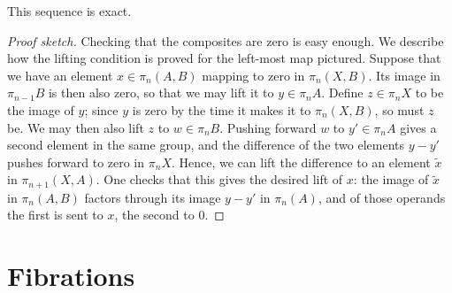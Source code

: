 \begin{lemma}
This sequence is exact.
\end{lemma}
\begin{proof}[Proof sketch]
Checking that the composites are zero is easy enough.
We describe how the lifting condition is proved for the left-most map pictured.
Suppose that we have an element $x \in \pi_n(A, B)$ mapping to zero in $\pi_n(X, B)$.
Its image in $\pi_{n-1} B$ is then also zero, so that we may lift it to $y \in \pi_n A$.
Define $z \in \pi_n X$ to be the image of $y$; since $y$ is zero by the time it makes it to $\pi_n(X, B)$, so must $z$ be.
We may then also lift $z$ to $w \in \pi_n B$.
Pushing forward $w$ to $y' \in \pi_n A$ gives a second element in the same group, and the difference of the two elements $y - y'$ pushes forward to zero in $\pi_n X$.
Hence, we can lift the difference to an element $\tilde x$ in $\pi_{n+1}(X, A)$.
One checks that this gives the desired lift of $x$: the image of $\tilde x$ in $\pi_n(A, B)$ factors through its image $y - y'$ in $\pi_n(A)$, and of those operands the first is sent to $x$, the second to $0$.
\end{proof}




\section{Fibrations}

